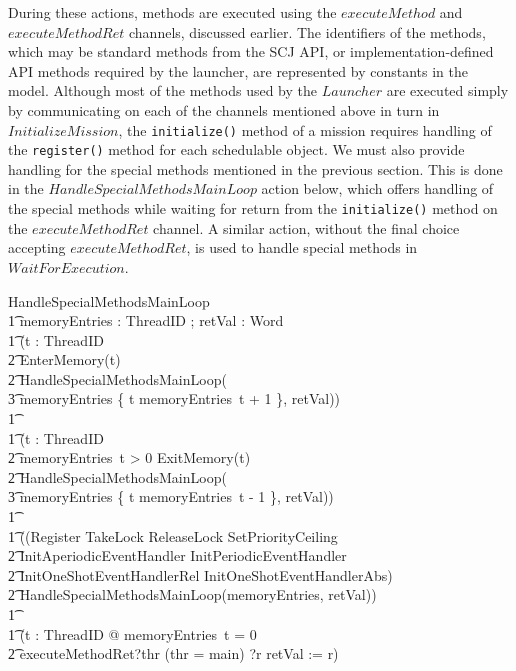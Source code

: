 During these actions, methods are executed using the $executeMethod$
and $executeMethodRet$ channels, discussed earlier.
The identifiers of the methods, which may be standard methods from the
SCJ API, or implementation-defined API methods required by the
launcher, are represented by constants in the model.
Although most of the methods used by the $Launcher$ are executed
simply by communicating on each of the channels mentioned above in
turn in $InitializeMission$, the \texttt{initialize()} method of a
mission requires handling of the \texttt{register()} method for each
schedulable object.
We must also provide handling for the special methods mentioned in the
previous section.
This is done in the $HandleSpecialMethodsMainLoop$ action below, which
offers handling of the special methods while waiting for return from
the \texttt{initialize()} method on the $executeMethodRet$ channel.
A similar action, without the final choice accepting
$executeMethodRet$, is used to handle special methods in
$WaitForExecution$.
\begin{circusaction}
  HandleSpecialMethodsMainLoop \circdef \\
  \t1 \circval memoryEntries : ThreadID \fun \nat; \circres retVal : Word \circspot \\
  \t1 (\Extchoice t : ThreadID \circspot \\
  \t2 EnterMemory(t) \circseq \\
  \t2 HandleSpecialMethodsMainLoop( \\
  \t3 memoryEntries \oplus \{ t \mapsto memoryEntries~t + 1 \}, retVal)) \\
  \t1 {} \extchoice {} \\
  \t1 (\Extchoice t : ThreadID \circspot \\
  \t2 \lcircguard memoryEntries~t > 0 \rcircguard \circguard ExitMemory(t) \circseq \\
  \t2 HandleSpecialMethodsMainLoop( \\
  \t3 memoryEntries \oplus \{ t \mapsto memoryEntries~t - 1 \}, retVal)) \\
  \t1 {} \extchoice {} \\
  \t1 ((Register \extchoice TakeLock \extchoice ReleaseLock \extchoice SetPriorityCeiling \\
  \t2 {} \extchoice InitAperiodicEventHandler \extchoice InitPeriodicEventHandler \\
  \t2 {} \extchoice InitOneShotEventHandlerRel \extchoice InitOneShotEventHandlerAbs) \circseq \\
  \t2 HandleSpecialMethodsMainLoop(memoryEntries, retVal)) \\
  \t1 {} \extchoice {} \\
  \t1 (\lcircguard \forall t : ThreadID @ memoryEntries~t = 0 \rcircguard \circguard {} \\
  \t2 executeMethodRet?thr \prefixcolon (thr = main) ?r \then retVal := r)
\end{circusaction}
